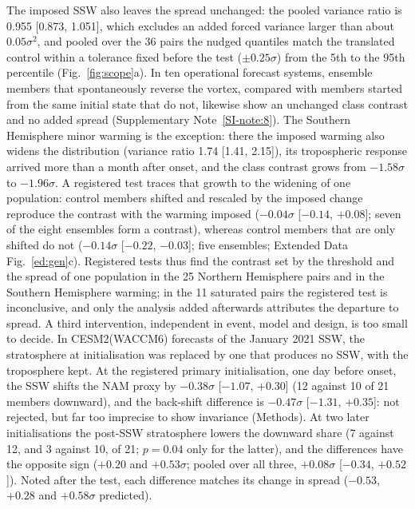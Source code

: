 \documentclass[11pt]{article}
\begin{document}
The imposed SSW also leaves the spread unchanged: the pooled variance ratio is 0.955 [0.873, 1.051], which excludes an added forced variance larger than about $0.05\sigma^2$, and pooled over the 36 pairs the nudged quantiles match the translated control within a tolerance fixed before the test ($\pm0.25\sigma$) from the 5th to the 95th percentile (Fig.~\ref{fig:scope}a). In ten operational forecast systems, ensemble members that spontaneously reverse the vortex, compared with members started from the same initial state that do not, likewise show an unchanged class contrast and no added spread (Supplementary Note~\ref{SI-note:8}). The Southern Hemisphere minor warming is the exception: there the imposed warming also widens the distribution (variance ratio 1.74 [1.41, 2.15]), its tropospheric response arrived more than a month after onset\cite{feng25}, and the class contrast grows from $-1.58\sigma$ to $-1.96\sigma$. A registered test traces that growth to the widening of one population: control members shifted and rescaled by the imposed change reproduce the contrast with the warming imposed ($-0.04\sigma$ [$-0.14$, $+0.08$]; seven of the eight ensembles form a contrast), whereas control members that are only shifted do not ($-0.14\sigma$ [$-0.22$, $-0.03$]; five ensembles; Extended Data Fig.~\ref{ed:gen}c). Registered tests thus find the contrast set by the threshold and the spread of one population in the 25 Northern Hemisphere pairs and in the Southern Hemisphere warming; in the 11 saturated pairs the registered test is inconclusive, and only the analysis added afterwards attributes the departure to spread. A third intervention, independent in event, model and design, is too small to decide. In CESM2(WACCM6) forecasts of the January 2021 SSW\cite{davis22}, the stratosphere at initialisation was replaced by one that produces no SSW, with the troposphere kept. At the registered primary initialisation, one day before onset, the SSW shifts the NAM proxy by $-0.38\sigma$ [$-1.07$, $+0.30$] (12 against 10 of 21 members downward), and the back-shift difference is $-0.47\sigma$ [$-1.31$, $+0.35$]: not rejected, but far too imprecise to show invariance (Methods). At two later initialisations the post-SSW stratosphere lowers the downward share (7 against 12, and 3 against 10, of 21; $p = 0.04$ only for the latter), and the differences have the opposite sign ($+0.20$ and $+0.53\sigma$; pooled over all three, $+0.08\sigma$ [$-0.34$, $+0.52$]). Noted after the test, each difference matches its change in spread ($-0.53$, $+0.28$ and $+0.58\sigma$ predicted).
\end{document}
